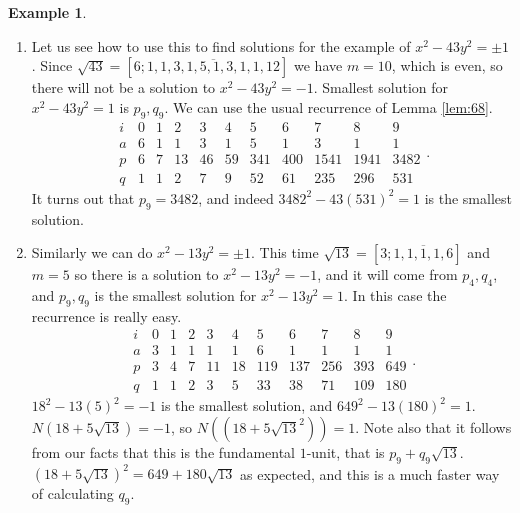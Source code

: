\documentclass{article}
\newcommand{\rb}[1]{\left( #1 \right)}
\renewcommand{\sb}[1]{\left[ #1 \right]}
\theoremstyle{definition}\newtheorem{definition}{Definition}
\theoremstyle{definition}\newtheorem{remark}[definition]{Remark}
\theoremstyle{definition}\newtheorem*{example}{Example}
\theoremstyle{definition}\newtheorem*{note}{Note}
\begin{document}
\begin{example}
\hfill
\begin{enumerate}
\item Let us see how to use this to find solutions for the example of $ x^2 - 43y^2 = \pm 1 $. Since $ \sqrt{43} = \sb{6; \overline{1, 1, 3, 1, 5, 1, 3, 1, 1, 12}} $ we have $ m = 10 $, which is even, so there will not be a solution to $ x^2 - 43y^2 = -1 $. Smallest solution for $ x^2 - 43y^2 = 1 $ is $ p_9, q_9 $. We can use the usual recurrence of Lemma \ref{lem:68}.
$$
\begin{array}{c|cccccccccc}
i & 0 & 1 & 2 & 3 & 4 & 5 & 6 & 7 & 8 & 9 \\
\hline
a & 6 & 1 & 1 & 3 & 1 & 5 & 1 & 3 & 1 & 1 \\
p & 6 & 7 & 13 & 46 & 59 & 341 & 400 & 1541 & 1941 & 3482 \\
q & 1 & 1 & 2 & 7 & 9 & 52 & 61 & 235 & 296 & 531
\end{array}.
$$
It turns out that $ p_9 = 3482 $, and indeed $ 3482^2 - 43\rb{531}^2 = 1 $ is the smallest solution.
\item Similarly we can do $ x^2 - 13y^2 = \pm 1 $. This time $ \sqrt{13} = \sb{3; \overline{1, 1, 1, 1, 6}} $ and $ m = 5 $ so there is a solution to $ x^2 - 13y^2 = -1 $, and it will come from $ p_4, q_4 $, and $ p_9, q_9 $ is the smallest solution for $ x^2 - 13y^2 = 1 $. In this case the recurrence is really easy.
$$
\begin{array}{c|cccccccccc}
i & 0 & 1 & 2 & 3 & 4 & 5 & 6 & 7 & 8 & 9 \\
\hline
a & 3 & 1 & 1 & 1 & 1 & 6 & 1 & 1 & 1 & 1 \\
p & 3 & 4 & 7 & 11 & 18 & 119 & 137 & 256 & 393 & 649 \\
q & 1 & 1 & 2 & 3 & 5 & 33 & 38 & 71 & 109 & 180
\end{array}.
$$
$ 18^2 - 13\rb{5}^2 = -1 $ is the smallest solution, and $ 649^2 - 13\rb{180}^2 = 1 $. $ N\rb{18 + 5\sqrt{13}} = -1 $, so $ N\rb{\rb{18 + 5\sqrt{13}^2}} = 1 $. Note also that it follows from our facts that this is the fundamental $ 1 $-unit, that is $ p_9 + q_9\sqrt{13} $. $ \rb{18 + 5\sqrt{13}}^2 = 649 + 180\sqrt{13} $ as expected, and this is a much faster way of calculating $ q_9 $.
\end{enumerate}
\end{example}

\end{document}
